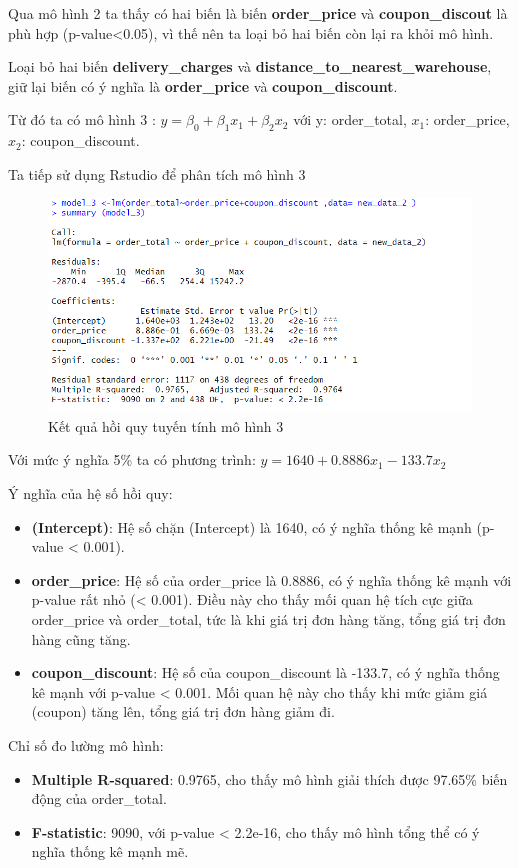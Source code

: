 Qua mô hình 2 ta thấy có hai biến là biến \textbf{order\_price} và \textbf{coupon\_discout} là phù hợp (p-value<0.05), vì thế nên ta loại bỏ hai biến còn lại ra khỏi mô hình.

Loại bỏ hai biến \textbf{delivery\_charges} và \textbf{distance\_to\_nearest\_warehouse}, giữ lại biến có ý nghĩa là \textbf{order\_price} và \textbf{coupon\_discount}.

Từ đó ta có mô hình 3 : $y= \beta_0 + \beta_1x_1 + \beta_2x_2$ với y: order\_total, $x_1$: order\_price, $x_2$: coupon\_discount.

Ta tiếp sử dụng Rstudio để phân tích mô hình 3
\begin{figure}[ht]
  \centering
  \includegraphics[width=0.7\linewidth]{graphics/5.5.4.png}
  \caption{Kết quả hồi quy tuyến tính mô hình 3 }
\end{figure}

Với mức ý nghĩa 5\% ta có phương trình: $y= 1640 + 0.8886x_1 - 133.7 x_2$

Ý nghĩa của hệ số hồi quy:
\begin{itemize}
\item\textbf{(Intercept)}: Hệ số chặn (Intercept) là 1640, có ý nghĩa thống kê mạnh (p-value < 0.001).
\item\textbf{order\_price}: Hệ số của order\_price là 0.8886, có ý nghĩa thống kê mạnh với p-value rất nhỏ (< 0.001). Điều này cho thấy mối quan hệ tích cực giữa order\_price và order\_total, tức là khi giá trị đơn hàng tăng, tổng giá trị đơn hàng cũng tăng.
\item\textbf{coupon\_discount}: Hệ số của coupon\_discount là -133.7, có ý nghĩa thống kê mạnh với p-value < 0.001. Mối quan hệ này cho thấy khi mức giảm giá (coupon) tăng lên, tổng giá trị đơn hàng giảm đi.
\end{itemize}

Chỉ số đo lường mô hình:

\begin{itemize}
\item\textbf{Multiple R-squared}: 0.9765, cho thấy mô hình giải thích được 97.65\% biến động của order\_total.
\item\textbf{F-statistic}: 9090, với p-value < 2.2e-16, cho thấy mô hình tổng thể có ý nghĩa thống kê mạnh mẽ.
\end{itemize}

